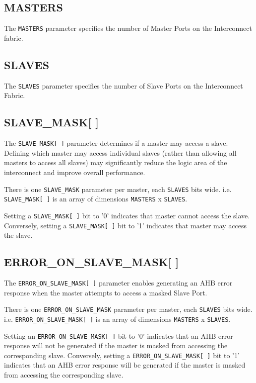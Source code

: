 \subsection{MASTERS}\label{masters}

The \texttt{MASTERS} parameter specifies the number of Master Ports on the
Interconnect fabric.

\subsection{SLAVES}\label{slaves}

The \texttt{SLAVES} parameter specifies the number of Slave Ports on the
Interconnect Fabric.

\subsection{SLAVE\_MASK[ ]}\label{slave_mask}

The \texttt{SLAVE\_MASK[\,]} parameter determines if a master may access a slave. Defining which
master may access individual slaves (rather than allowing all masters to access all slaves) may
significantly reduce the logic area of the interconnect and improve overall performance.

There is one \texttt{SLAVE\_MASK} parameter per master, each \texttt{SLAVES} bits wide.
i.e. \texttt{SLAVE\_MASK[\,]} is an array of dimensions \texttt{MASTERS} x \texttt{SLAVES}.

Setting a \texttt{SLAVE\_MASK[\,]} bit to '0' indicates that master cannot access the slave.
Conversely, setting a \texttt{SLAVE\_MASK[\,]} bit to '1' indicates that master may access the slave.

\subsection{ERROR\_ON\_SLAVE\_MASK[ ]}\label{error_on_slave_mask}

The \texttt{ERROR\_ON\_SLAVE\_MASK[\,]} parameter enables generating an AHB error response when the
master attempts to access a masked Slave Port.

There is one \texttt{ERROR\_ON\_SLAVE\_MASK} parameter per master, each \texttt{SLAVES} bits wide.
i.e. \texttt{ERROR\_ON\_SLAVE\_MASK[\,]} is an array of dimensions \texttt{MASTERS} x \texttt{SLAVES}.

Setting an \texttt{ERROR\_ON\_SLAVE\_MASK[\,]} bit to '0' indicates that an AHB error response will not be generated
if the master is masked from accessing the corresponding slave.
Conversely, setting a \texttt{ERROR\_ON\_SLAVE\_MASK[\,]} bit to '1' indicates that an AHB error response will
be generated if the master is masked from accessing the corresponding slave.

